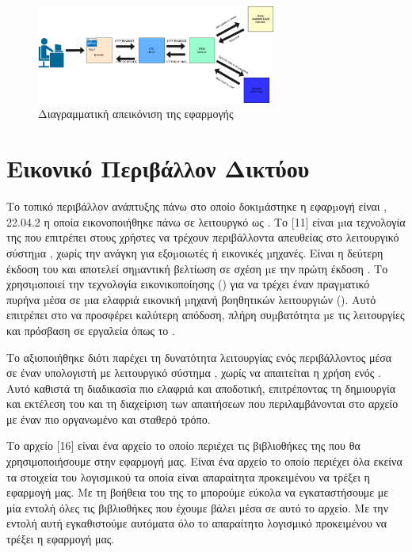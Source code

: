 \begin{figure}[h]
	\centering
	\includegraphics[width=0.7\textwidth]{graphics/MTV.drawio.png}
	\caption{Διαγραμματική απεικόνιση της εφαρμογής}
\end{figure}



\section{Εικονικό Περιβάλλον Δικτύου }


Το τοπικό περιβάλλον ανάπτυξης πάνω στο οποίο δοκιµάστηκε η εφαρµογή είναι ,  22.04.2  η οποία εικονοποιήθηκε πάνω σε λειτουργκό  ως . Το [11] είναι µια τεχνολογία της  που επιτρέπει στους χρήστες  να τρέχουν  περιβάλλοντα απευθείας στο λειτουργικό σύστηµα , χωρίς την ανάγκη για εξοµοιωτές ή εικονικές µηχανές. Είναι η δεύτερη έκδοση του  και αποτελεί σηµαντική βελτίωση σε σχέση µε την πρώτη έκδοση . Το  χρησιµοποιεί την τεχνολογία εικονικοποίησης () για να τρέχει έναν πραγµατικό πυρήνα  µέσα σε µια ελαφριά εικονική µηχανή βοηθητικών λειτουργιών (). Αυτό επιτρέπει στο  να προσφέρει καλύτερη απόδοση, πλήρη συµβατότητα µε τις λειτουργίες  και πρόσβαση σε εργαλεία όπως το .


Το  αξιοποιήθηκε διότι παρέχει τη δυνατότητα λειτουργίας ενός 
περιβάλλοντος  μέσα σε έναν υπολογιστή με λειτουργικό 
σύστημα , χωρίς να απαιτείται η χρήση ενός . 
Αυτό καθιστά τη διαδικασία πιο ελαφριά και αποδοτική, επιτρέποντας τη 
δημιουργία και εκτέλεση του  και τη διαχείριση των 
απαιτήσεων που περιλαμβάνονται στο αρχείο  με έναν πιο οργανωμένο και σταθερό τρόπο.

Το αρχείο [16] είναι ένα αρχείο το οποίο περιέχει τις βιβλιοθήκες της  που θα χρησιμοποιήσουμε στην εφαρμογή μας. Είναι ένα  αρχείο το οποίο περιέχει όλα εκείνα τα στοιχεία του λογισμικού τα οποία είναι απαραίτητα προκειμένου να τρέξει η εφαρμογή μας. Με τη βοήθεια του  της  το  μπορούμε εύκολα να εγκαταστήσουμε με μία εντολή όλες τις βιβλιοθήκες που έχουμε βάλει μέσα σε αυτό το  αρχείο. Με την εντολή αυτή  εγκαθιστούμε αυτόματα όλο το απαραίτητο λογισμικό προκειμένου να τρέξει η εφαρμογή μας.


